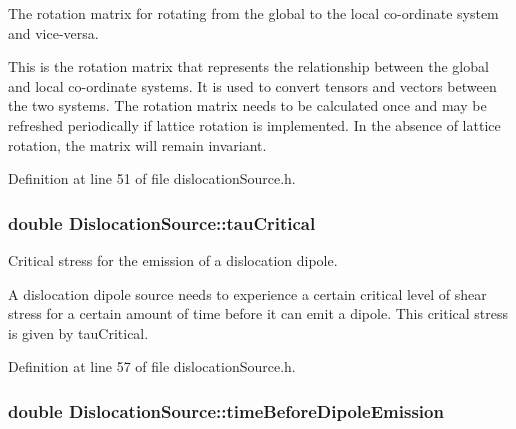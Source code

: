 \-The rotation matrix for rotating from the global to the local co-\/ordinate system and vice-\/versa. 

\-This is the rotation matrix that represents the relationship between the global and local co-\/ordinate systems. \-It is used to convert tensors and vectors between the two systems. \-The rotation matrix needs to be calculated once and may be refreshed periodically if lattice rotation is implemented. \-In the absence of lattice rotation, the matrix will remain invariant. 

\-Definition at line 51 of file dislocation\-Source.\-h.

\hypertarget{classDislocationSource_ad91294a3ab5b6f6156a2ad67b9df954e}{
\subsubsection[{tau\-Critical}]{\setlength{\rightskip}{0pt plus 5cm}double {\bf \-Dislocation\-Source\-::tau\-Critical}}}\label{de/de3/classDislocationSource_ad91294a3ab5b6f6156a2ad67b9df954e}


\-Critical stress for the emission of a dislocation dipole. 

\-A dislocation dipole source needs to experience a certain critical level of shear stress for a certain amount of time before it can emit a dipole. \-This critical stress is given by tau\-Critical. 

\-Definition at line 57 of file dislocation\-Source.\-h.

\hypertarget{classDislocationSource_a973edf3f8545a4082393ce54b7b1216d}{
\subsubsection[{time\-Before\-Dipole\-Emission}]{\setlength{\rightskip}{0pt plus 5cm}double {\bf \-Dislocation\-Source\-::time\-Before\-Dipole\-Emission}}}\label{de/de3/classDislocationSource_a973edf3f8545a4082393ce54b7b1216d}


